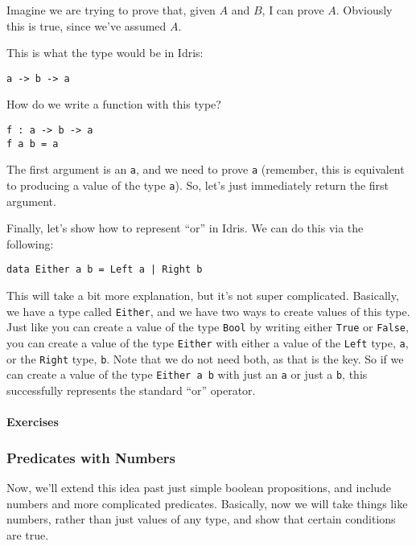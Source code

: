 \documentclass{article}
\newcommand{\inline}[1]{\texttt{#1}}
\begin{document}
Imagine we are trying to prove that, given $A$ and $B$, I can prove $A$.
Obviously this is true, since we've assumed $A$.

This is what the type would be in Idris:
\begin{verbatim}
a -> b -> a
\end{verbatim}

How do we write a function with this type?

\begin{verbatim}
f : a -> b -> a
f a b = a
\end{verbatim}

The first argument is an \inline{a}, and we need to prove \inline{a} (remember, this is equivalent to producing a value of the type \inline{a}).
So, let's just immediately return the first argument.

Finally, let’s show how to represent ``or'' in Idris.
We can do this via the following:

\begin{verbatim}
data Either a b = Left a | Right b
\end{verbatim}

This will take a bit more explanation, but it's not super complicated.
Basically, we have a type called \inline{Either}, and we have two ways to create values of this type.
Just like you can create a value of the type \inline{Bool} by writing either \inline{True} or \inline{False}, you can create a value of the type \inline{Either} with either a value of the \inline{Left} type, \inline{a}, or the \inline{Right} type, \inline{b}.
Note that we do not need both, as that is the key.
So if we can create a value of the type \inline{Either a b} with just an \inline{a} or just a \inline{b}, this successfully represents the standard ``or'' operator.

\paragraph{Exercises}

\subsubsection{Predicates with Numbers}
Now, we’ll extend this idea past just simple boolean propositions, and include numbers and more complicated predicates.
Basically, now we will take things like numbers, rather than just values of any type, and show that certain conditions are true.
\end{document}
